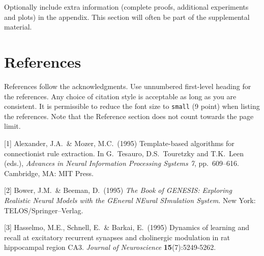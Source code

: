 \documentclass{article}
\begin{document}
Optionally include extra information (complete proofs, additional experiments
and plots) in the appendix. \cite{pytorch_sac}This section will often be part
of the supplemental material.

\section*{References}

References \cite{latexcompanion}follow the acknowledgments. Use unnumbered
first-level heading for the references. Any choice of citation style is
acceptable as long as you are consistent. It is permissible to reduce the font
size to \verb+small+ (9 point) when listing the references. Note that the
Reference section does not count towards the page limit. \medskip

{
\small

[1] Alexander, J.A.\ \& Mozer, M.C.\ (1995) Template-based algorithms for
connectionist rule extraction. In G.\ Tesauro, D.S.\ Touretzky and T.K.\ Leen
(eds.), {\it Advances in Neural Information Processing Systems 7},
pp.\ 609--616. Cambridge, MA: MIT Press.

      [2] Bower, J.M.\ \& Beeman, D.\ (1995) {\it The Book of GENESIS: Exploring
            Realistic Neural Models with the GEneral NEural SImulation System.}  New York:
TELOS/Springer--Verlag.

[3] Hasselmo, M.E., Schnell, E.\ \& Barkai, E.\ (1995) Dynamics of learning and
recall at excitatory recurrent synapses and cholinergic modulation in rat
hippocampal region CA3. {\it Journal of Neuroscience} {\bf 15}(7):5249-5262.
}

\newpage
\nocite{*}


\end{document}
